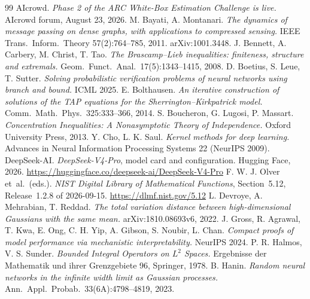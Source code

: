\documentclass[10pt]{article}
\begin{document}
\begin{thebibliography}{99}\small
{} AIcrowd. \emph{Phase 2 of the ARC White-Box Estimation Challenge is live.} AIcrowd forum, August 23, 2026.
 M. Bayati, A. Montanari. \emph{The dynamics of message passing on dense graphs, with applications to compressed sensing.} IEEE Trans.\ Inform.\ Theory 57(2):764--785, 2011. arXiv:1001.3448.
 J. Bennett, A. Carbery, M. Christ, T. Tao. \emph{The Brascamp--Lieb inequalities: finiteness, structure and extremals.} Geom.\ Funct.\ Anal.\ 17(5):1343--1415, 2008.
 D. Boetius, S. Leue, T. Sutter. \emph{Solving probabilistic verification problems of neural networks using branch and bound.} ICML 2025.
 E. Bolthausen. \emph{An iterative construction of solutions of the TAP equations for the Sherrington--Kirkpatrick model.} Comm.\ Math.\ Phys.\ 325:333--366, 2014.
 S. Boucheron, G. Lugosi, P. Massart. \emph{Concentration Inequalities: A Nonasymptotic Theory of Independence.} Oxford University Press, 2013.
 Y. Cho, L. K. Saul. \emph{Kernel methods for deep learning.} Advances in Neural Information Processing Systems 22 (NeurIPS 2009).
 DeepSeek-AI. \emph{DeepSeek-V4-Pro}, model card and configuration. Hugging Face, 2026. \url{https://huggingface.co/deepseek-ai/DeepSeek-V4-Pro}
 F. W. J. Olver et~al.\ (eds.). \emph{NIST Digital Library of Mathematical Functions}, Section~5.12, Release~1.2.8 of 2026-09-15. \url{https://dlmf.nist.gov/5.12}
 L. Devroye, A. Mehrabian, T. Reddad. \emph{The total variation distance between high-dimensional Gaussians with the same mean.} arXiv:1810.08693v6, 2022.
 J. Gross, R. Agrawal, T. Kwa, E. Ong, C. H. Yip, A. Gibson, S. Noubir, L. Chan. \emph{Compact proofs of model performance via mechanistic interpretability.} NeurIPS 2024.
 P. R. Halmos, V. S. Sunder. \emph{Bounded Integral Operators on $L^2$ Spaces.} Ergebnisse der Mathematik und ihrer Grenzgebiete 96, Springer, 1978.
 B. Hanin. \emph{Random neural networks in the infinite width limit as Gaussian processes.} Ann.\ Appl.\ Probab.\ 33(6A):4798--4819, 2023.

\end{thebibliography}
\end{document}

